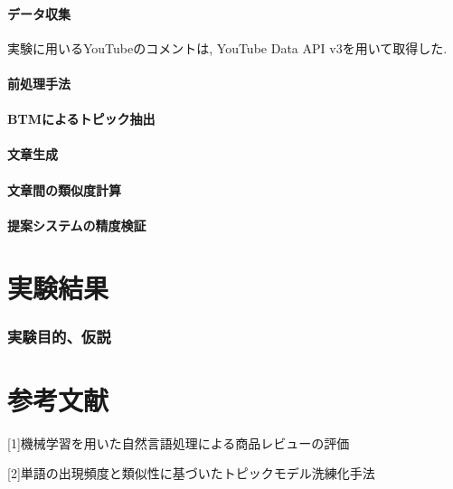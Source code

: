 \documentclass{ltjarticle}
\begin{document}
\subsection{データ収集}
実験に用いるYouTubeのコメントは, YouTube Data API v3を用いて取得した. 
\subsection{前処理手法}
\subsection{BTMによるトピック抽出}
\subsection{文章生成}
\subsection{文章間の類似度計算}
\subsection{提案システムの精度検証}
\newpage
\part{実験結果}
\section{実験目的、仮説}
\part{参考文献}
[1]機械学習を用いた自然言語処理による商品レビューの評価

[2]単語の出現頻度と類似性に基づいたトピックモデル洗練化手法
\end{document}

